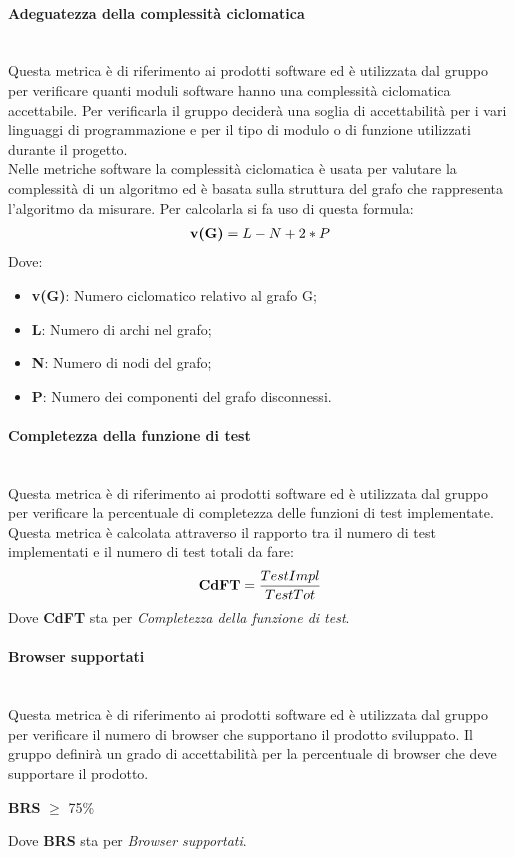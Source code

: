 \paragraph{Adeguatezza della complessità ciclomatica}\mbox{}\\
Questa metrica è di riferimento ai prodotti software ed è utilizzata dal gruppo per verificare quanti moduli software hanno una complessità ciclomatica accettabile. Per verificarla il gruppo deciderà una soglia di accettabilità per i vari linguaggi di programmazione e per il tipo di modulo o di funzione utilizzati durante il progetto.\\
Nelle metriche software la complessità ciclomatica è usata per valutare la complessità di un algoritmo ed è basata sulla struttura del grafo che rappresenta l’algoritmo da misurare. Per calcolarla si fa uso di questa formula:
\begin{align*}
	\centering
	\textbf{v(G)} = L - N + 2 * P
\end{align*}
Dove:
\begin{itemize}
	\item \textbf{v(G)}: Numero ciclomatico relativo al grafo G;
	\item \textbf{L}: Numero di archi nel grafo;
	\item \textbf{N}: Numero di nodi del grafo;
	\item \textbf{P}: Numero dei componenti del grafo disconnessi.
\end{itemize}
\paragraph{Completezza della funzione di test}\mbox{}\\
Questa metrica è di riferimento ai prodotti software ed è utilizzata dal gruppo per verificare la percentuale di completezza delle funzioni di test implementate. Questa metrica è calcolata attraverso il rapporto tra il numero di test implementati e il numero di test totali da fare:
\begin{align*}
	\centering
	\textbf{CdFT} = \frac{TestImpl}{TestTot}
\end{align*}
Dove \textbf{CdFT} sta per \textit{Completezza della funzione di test}.
\paragraph{Browser supportati}\mbox{}\\
Questa metrica è di riferimento ai prodotti software ed è utilizzata dal gruppo per verificare il numero di browser che supportano il prodotto sviluppato. Il gruppo definirà un grado di accettabilità per la percentuale di browser che deve supportare il prodotto.
\begin{center}
	\textbf{BRS} $\geq$ 75\%
\end{center}
Dove \textbf{BRS} sta per \textit{Browser supportati}.







